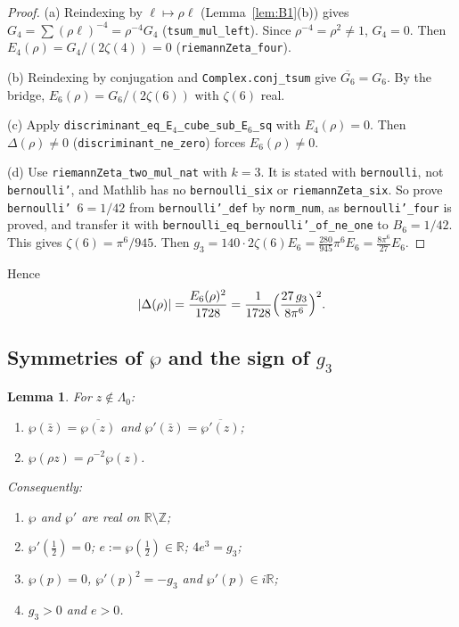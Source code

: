 \documentclass[11pt]{article}
\newtheorem{lemma}[theorem]{Lemma}
\theoremstyle{definition}
\theoremstyle{remark}
\newcommand{\R}{\mathbb R}
\newcommand{\Z}{\mathbb Z}
\newcommand{\LamO}{\Lambda_0}
\newcommand{\lean}[1]{\texttt{#1}}
\begin{document}
\begin{proof}
(a) Reindexing by $\ell\mapsto\rho\ell$ (Lemma~\ref{lem:B1}(b)) gives $G_4=\sum(\rho\ell)^{-4}=\rho^{-4}G_4$
(\lean{tsum\_mul\_left}). Since $\rho^{-4}=\rho^2\ne1$, $G_4=0$. Then $E_4(\rho)=G_4/(2\zeta(4))=0$
(\lean{riemannZeta\_four}).

(b) Reindexing by conjugation and \lean{Complex.conj\_tsum} give $\overline{G_6}=G_6$. By the bridge,
$E_6(\rho)=G_6/(2\zeta(6))$ with $\zeta(6)$ real.

(c) Apply \lean{discriminant\_eq\_E$_4$\_cube\_sub\_E$_6$\_sq} with $E_4(\rho)=0$. Then $\Delta(\rho)\ne0$
(\lean{discriminant\_ne\_zero}) forces $E_6(\rho)\neq0$.

(d) Use \lean{riemannZeta\_two\_mul\_nat} with $k=3$. It is stated with
\lean{bernoulli}, not \lean{bernoulli'}, and Mathlib has no \lean{bernoulli\_six} or \lean{riemannZeta\_six}. So
prove \lean{bernoulli'}\ $6=1/42$ from \lean{bernoulli'\_def} by \lean{norm\_num}, as
\lean{bernoulli'\_four} is proved, and transfer it with \lean{bernoulli\_eq\_bernoulli'\_of\_ne\_one} to $B_6=1/42$. This gives $\zeta(6)=\pi^6/945$. Then
$g_3=140\cdot2\zeta(6)E_6=\frac{280}{945}\pi^6E_6=\frac{8\pi^6}{27}E_6$.
\end{proof}

\noindent Hence
\begin{equation}\label{eq:Delta-g3}
 |\Delta(\rho)|=\frac{E_6(\rho)^2}{1728}=\frac{1}{1728}\Bigl(\frac{27\,g_3}{8\pi^6}\Bigr)^2 .
\end{equation}

\subsection{Symmetries of $\wp$ and the sign of $g_3$}

\begin{lemma}\label{lem:C3}
For $z\notin\LamO$:
\begin{enumerate}
\item[(a)] $\wp(\bar z)=\overline{\wp(z)}$ and $\wp'(\bar z)=\overline{\wp'(z)}$;
\item[(b)] $\wp(\rho z)=\rho^{-2}\wp(z)$.
\end{enumerate}
Consequently:
\begin{enumerate}
\item[(c)] $\wp$ and $\wp'$ are real on $\R\setminus\Z$;
\item[(d)] $\wp'(\tfrac12)=0$; $e:=\wp(\tfrac12)\in\R$; $4e^3=g_3$;
\item[(e)] $\wp(p)=0$, $\wp'(p)^2=-g_3$ and $\wp'(p)\in i\R$;
\item[(f)] $g_3>0$ and $e>0$.
\end{enumerate}
\end{lemma}
\end{document}
